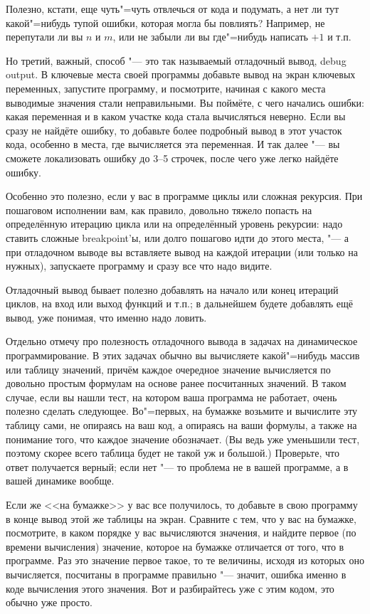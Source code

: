 \documentclass[a4paper,10pt]{problems}
\begin{document}
Полезно, кстати, еще чуть"=чуть отвлечься от кода и подумать, а нет ли тут какой"=нибудь тупой ошибки, которая могла бы повлиять?
Например, не перепутали ли вы $n$ и $m$, или не забыли ли вы где"=нибудь написать $+1$ и т.п.

Но третий, важный, способ "--- это так называемый отладочный вывод, debug output. 
В ключевые места своей программы добавьте вывод на экран ключевых переменных, запустите программу, и посмотрите, 
начиная с какого места выводимые значения стали неправильными.
Вы поймёте, с чего начались ошибки: какая переменная и в каком участке кода стала вычисляться неверно. 
Если вы сразу не найдёте ошибку, то добавьте более подробный вывод в этот участок кода, особенно в места, где вычисляется эта переменная.
И так далее "--- вы сможете локализовать ошибку до 3--5 строчек, после чего уже легко найдёте ошибку.

Особенно это полезно, если у вас в программе циклы или сложная рекурсия. 
При пошаговом исполнении вам, как правило, довольно тяжело попасть на определённую итерацию цикла или на определённый уровень рекурсии:
надо ставить сложные breakpoint'ы, или долго пошагово идти до этого места, "--- а при отладочном выводе вы вставляете вывод на каждой итерации
(или только на нужных), запускаете программу и сразу все что надо видите.

Отладочный вывод бывает полезно добавлять на начало или конец итераций циклов, на вход или выход функций и т.п.; 
в дальнейшем будете добавлять ещё вывод, уже понимая, что именно надо ловить.

Отдельно отмечу про полезность отладочного вывода в задачах на динамическое программирование.
В этих задачах обычно вы вычисляете какой"=нибудь массив или таблицу значений, причём каждое очередное значение вычисляется по довольно простым формулам
на основе ранее посчитанных значений. 
В таком случае, если вы нашли тест, на котором ваша программа не работает, очень полезно сделать следующее.
Во"=первых, на бумажке возьмите и вычислите эту таблицу сами, не опираясь на ваш код, а опираясь на ваши формулы,
а также на понимание того, что каждое значение обозначает. 
(Вы ведь уже уменьшили тест, поэтому скорее всего таблица будет не такой уж и большой.)
Проверьте, что ответ получается верный; если нет "--- то проблема не в вашей программе, а в вашей динамике вообще.

Если же <<на бумажке>> у вас все получилось, то добавьте в свою программу в конце вывод этой же таблицы на экран.
Сравните с тем, что у вас на бумажке, посмотрите, в каком порядке у вас вычисляются значения, и найдите первое (по времени вычисления) значение,
которое на бумажке отличается от того, что в программе. 
Раз это значение первое такое, то те величины, исходя из которых оно вычисляется, посчитаны в программе правильно "--- значит, 
ошибка именно в коде вычисления этого значения. 
Вот и разбирайтесь уже с этим кодом, это обычно уже просто.
\end{document}
